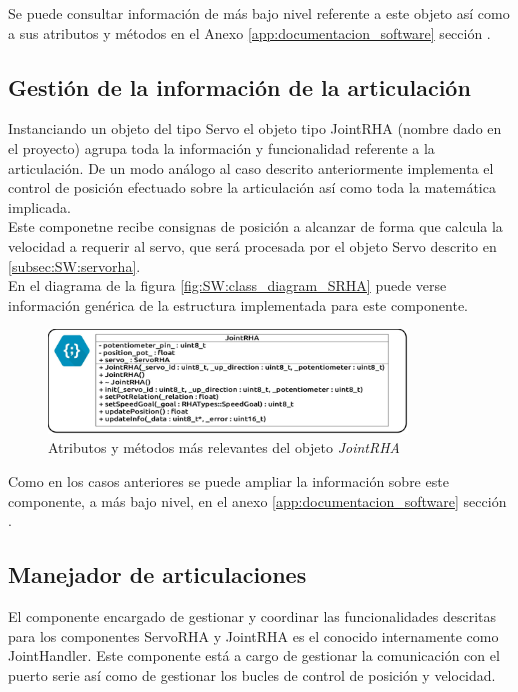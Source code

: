         Se puede consultar información de más bajo nivel referente a este objeto así como a sus atributos y métodos en el Anexo \ref{app:documentacion_software} sección \completar.

    \subsection{Gestión de la información de la articulación} \label{subsec:SW:jointrha}
        Instanciando un objeto del tipo Servo el objeto tipo JointRHA (nombre dado en el proyecto) agrupa toda la información y funcionalidad referente a la articulación. De un modo análogo al caso descrito anteriormente implementa el control de posición efectuado sobre la articulación así como toda la matemática implicada.
        \\
        Este componetne recibe consignas de posición a alcanzar de forma que calcula la velocidad a requerir al servo, que será procesada por el objeto Servo descrito en \ref{subsec:SW:servorha}.
        \\
        En el diagrama de la figura \ref{fig:SW:class_diagram_SRHA} puede verse información genérica de la estructura implementada para este componente.
        \begin{figure}[H]
            \centering
            \includegraphics[width=0.85\textwidth]{figuras/Imagenes_SW/class_diagram_JRHA.jpg}
            \caption{Atributos y métodos más relevantes del objeto \textit{JointRHA}}
            \label{fig:SW:class_diagram_JRHA}
        \end{figure}

        Como en los casos anteriores se puede ampliar la información sobre este componente, a más bajo nivel, en el anexo \ref{app:documentacion_software} sección \completar.
    \subsection{Manejador de articulaciones} \label{subsec:SW:joint_handler}
        El componente encargado de gestionar y coordinar las funcionalidades descritas para los componentes ServoRHA y JointRHA es el conocido internamente como JointHandler. Este componente está a cargo de gestionar la comunicación con el puerto serie así como de gestionar los bucles de control de posición y velocidad.
        \\
        
